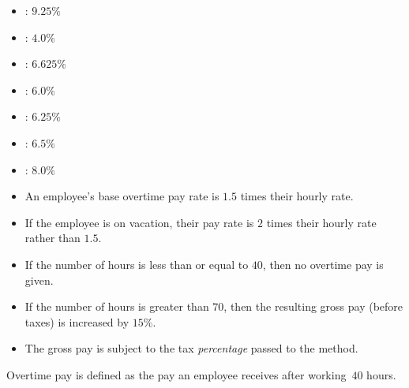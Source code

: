 \begin{itemize}
    \item {}: $9.25\%$
    \item {}: $4.0\%$
    \item {}: $6.625\%$
    \item {}: $6.0\%$
    \item {}: $6.25\%$
    \item {}: $6.5\%$
    \item {}: $8.0\%$
\end{itemize}

\begin{itemize}
    \item An employee's base overtime pay rate is $1.5$ times their hourly rate.
    \item If the employee is on vacation, their pay rate is $2$ times their hourly rate rather than $1.5$.
    \item If the number of hours is less than or equal to $40$, then no overtime pay is given.
    \item If the number of hours is greater than $70$, then the resulting gross pay (before taxes) is increased by $15\%$.
    \item The gross pay is subject to the tax \emph{percentage} passed to the method. 
\end{itemize}

Overtime pay is defined as the pay an employee receives after working~$40$ hours.

